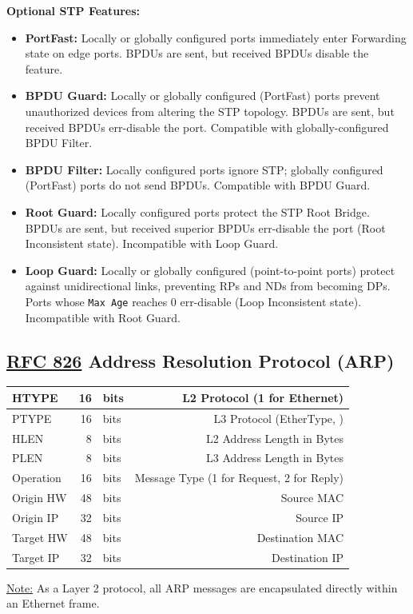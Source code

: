 \documentclass[12pt]{article}
\newif\ifcolor											%
\newcommand{\note}[1]{\ifcolor \colorbox{#1}{Note:}\else \underline{Note:}\fi}
\newcommand{\RFC}[1]{\href{https://datatracker.ietf.org/doc/html/rfc#1}{RFC #1}}
\begin{document}
	\textbf{Optional STP Features:}
	\begin{itemize}
		\label{itm:STP FEATURES}
		\item{\textbf{PortFast:} Locally or globally configured ports immediately enter Forwarding state on edge ports. BPDUs are sent, but received BPDUs disable the feature.}
		\item{\textbf{BPDU Guard:} Locally or globally configured (PortFast) ports prevent unauthorized devices from altering the STP topology. BPDUs are sent, but received BPDUs err-disable the port. Compatible with globally-configured BPDU Filter.}
		\item{\textbf{BPDU Filter:} Locally configured ports ignore STP; globally configured (PortFast) ports do not send BPDUs. Compatible with BPDU Guard.}
		\item{\textbf{Root Guard:} Locally configured ports protect the STP Root Bridge. BPDUs are sent, but received superior BPDUs err-disable the port (Root Inconsistent state). Incompatible with Loop Guard.}
		\item{\textbf{Loop Guard:} Locally or globally configured (point-to-point ports) protect against unidirectional links, preventing RPs and NDs from becoming DPs. Ports whose \texttt{Max Age} reaches 0 err-disable (Loop Inconsistent state). Incompatible with Root Guard.}
	\end{itemize}


	\subsection[RFC 826 ARP]{\RFC{826} Address Resolution Protocol (ARP) \label{subsec:ARP}}
	\begin{table}[H]
	\centering
	\begin{tabular}{| l | r @{ } l | r |}\hline
	HTYPE	& 16	& bits	& L2 Protocol (1 for Ethernet)\\\hline
	PTYPE	& 16	& bits	& L3 Protocol (EtherType, \Cref{tab:ETHERTYPE})\\\hline
	HLEN		& 8	& bits	& L2 Address Length in Bytes\\\hline
	PLEN		& 8	& bits	& L3 Address Length in Bytes\\\hline
	Operation	& 16	& bits	& Message Type (1 for Request, 2 for Reply)\\\hline
	Origin HW 	& 48	& bits	& Source MAC\\\hline
	Origin IP	& 32	& bits	& Source IP\\\hline
	Target HW 	& 48	& bits	& Destination MAC\\\hline
	Target IP	& 32	& bits	& Destination IP\\\hline
	\end{tabular}\end{table}
	\note{Goldenrod} As a Layer 2 protocol, all ARP messages are encapsulated directly within an Ethernet frame.
\end{document}
